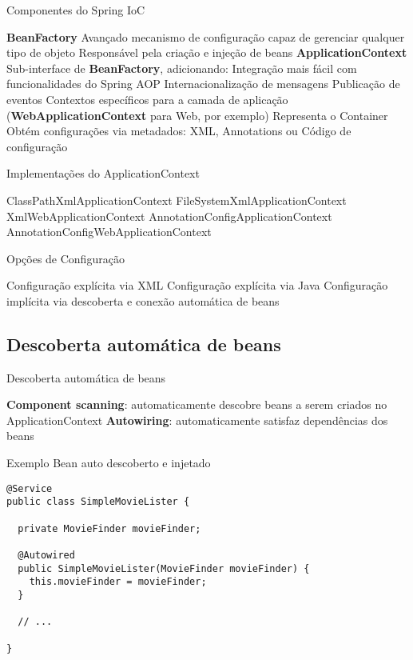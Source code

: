 \documentclass{beamer}
\begin{document}
\begin{frame}{Componentes do Spring IoC}
 \begin{outline}
   \textbf{BeanFactory}
     Avançado mecanismo de configuração capaz de gerenciar qualquer tipo de objeto
     Responsável pela criação e injeção de beans
   \textbf{ApplicationContext}
     Sub-interface de \textbf{BeanFactory}, adicionando:
       Integração mais fácil com funcionalidades do Spring AOP
       Internacionalização de mensagens
       Publicação de eventos
       Contextos específicos para a camada de aplicação (\textbf{WebApplicationContext} para Web, por exemplo)
     Representa o Container
     Obtém configurações via metadados: XML, Annotations ou Código de configuração
 \end{outline}
\end{frame}

\begin{frame}{Implementações do ApplicationContext}
 \begin{outline}
  \1 ClassPathXmlApplicationContext
  \1 FileSystemXmlApplicationContext
  \1 XmlWebApplicationContext
  \1 AnnotationConfigApplicationContext
  \1 AnnotationConfigWebApplicationContext
 \end{outline}
\end{frame}

\begin{frame}{Opções de Configuração}
 \begin{outline}
   Configuração explícita via XML
   Configuração explícita via Java
   Configuração implícita via descoberta e conexão automática de beans
 \end{outline}
\end{frame}

\subsection{Descoberta automática de beans}

\begin{frame}{Descoberta automática de beans}
 \begin{outline}
   \textbf{Component scanning}: automaticamente descobre beans a serem criados no ApplicationContext
   \textbf{Autowiring}: automaticamente satisfaz dependências dos beans
 \end{outline}
\end{frame}

\begin{frame}[fragile]{Exemplo Bean auto descoberto e injetado}
 \begin{verbatim}
@Service
public class SimpleMovieLister {

  private MovieFinder movieFinder;

  @Autowired
  public SimpleMovieLister(MovieFinder movieFinder) {
    this.movieFinder = movieFinder;
  }
  
  // ...

}
  \end{verbatim}
\end{frame}
\end{document}
